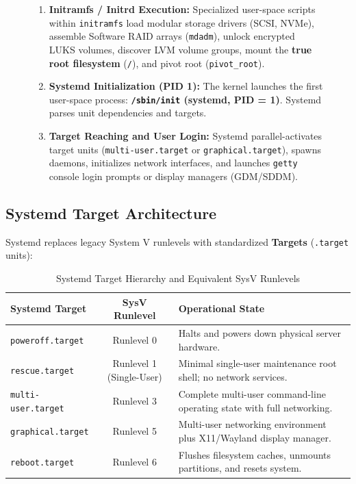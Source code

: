 \begin{figure}[htbp]
\begin{tcolorbox}[colback=codebg, colframe=primary, title=\textbf{The Eight Stages of the Linux Boot Pipeline}]
\begin{enumerate}
    \item \textbf{Initramfs / Initrd Execution:} Specialized user-space scripts within \texttt{initramfs} load modular storage drivers (SCSI, NVMe), assemble Software RAID arrays (\texttt{mdadm}), unlock encrypted LUKS volumes, discover LVM volume groups, mount the \textbf{true root filesystem} (\texttt{/}), and pivot root (\texttt{pivot\_root}).
    \item \textbf{Systemd Initialization (PID 1):} The kernel launches the first user-space process: \textbf{\texttt{/sbin/init} (systemd, PID = 1)}. Systemd parses unit dependencies and targets.
    \item \textbf{Target Reaching and User Login:} Systemd parallel-activates target units (\texttt{multi-user.target} or \texttt{graphical.target}), spawns daemons, initializes network interfaces, and launches \texttt{getty} console login prompts or display managers (GDM/SDDM).
\end{enumerate}
\end{tcolorbox}
\end{figure}

\subsection{Systemd Target Architecture}
Systemd replaces legacy System V runlevels with standardized \textbf{Targets} (\texttt{.target} units):
\begin{table}[htbp]
\centering
\small
\caption{Systemd Target Hierarchy and Equivalent SysV Runlevels}
\label{tab:systemd_targets}
\begin{tabularx}{\textwidth}{l c X}
\toprule
\textbf{Systemd Target} & \textbf{SysV Runlevel} & \textbf{Operational State} \\
\midrule
\texttt{poweroff.target} & Runlevel 0 & Halts and powers down physical server hardware. \\
\texttt{rescue.target} & Runlevel 1 (Single-User) & Minimal single-user maintenance root shell; no network services. \\
\texttt{multi-user.target} & Runlevel 3 & Complete multi-user command-line operating state with full networking. \\
\texttt{graphical.target} & Runlevel 5 & Multi-user networking environment plus X11/Wayland display manager. \\
\texttt{reboot.target} & Runlevel 6 & Flushes filesystem caches, unmounts partitions, and resets system. \\
\bottomrule
\end{tabularx}
\end{table}

